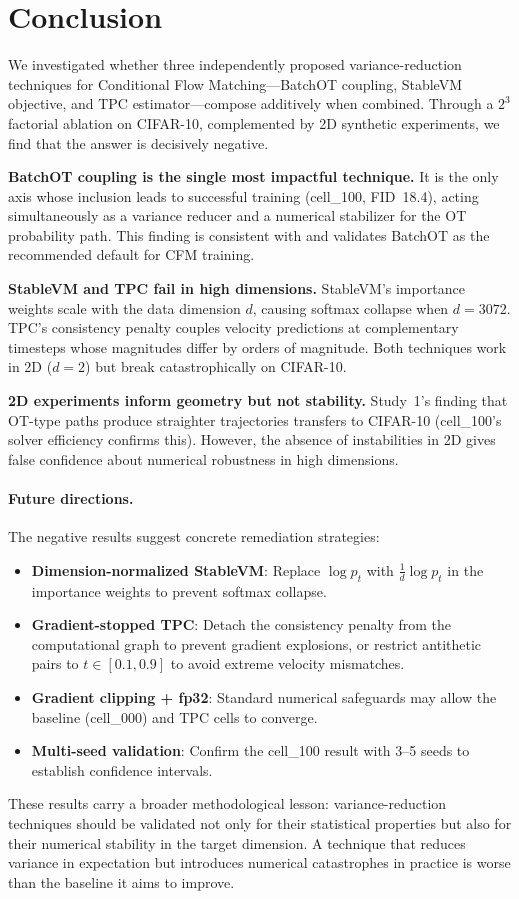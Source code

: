 \section{Conclusion}
\label{sec:conclusion}

We investigated whether three independently proposed variance-reduction techniques for Conditional Flow Matching---BatchOT coupling, StableVM objective, and TPC estimator---compose additively when combined. Through a $2^3$ factorial ablation on CIFAR-10, complemented by 2D synthetic experiments, we find that the answer is decisively negative.

\textbf{BatchOT coupling is the single most impactful technique.} It is the only axis whose inclusion leads to successful training (cell\_100, FID~18.4), acting simultaneously as a variance reducer and a numerical stabilizer for the OT probability path. This finding is consistent with \citet{tong2024improving} and validates BatchOT as the recommended default for CFM training.

\textbf{StableVM and TPC fail in high dimensions.} StableVM's importance weights scale with the data dimension $d$, causing softmax collapse when $d = 3072$. TPC's consistency penalty couples velocity predictions at complementary timesteps whose magnitudes differ by orders of magnitude. Both techniques work in 2D ($d=2$) but break catastrophically on CIFAR-10.

\textbf{2D experiments inform geometry but not stability.} Study~1's finding that OT-type paths produce straighter trajectories transfers to CIFAR-10 (cell\_100's solver efficiency confirms this). However, the absence of instabilities in 2D gives false confidence about numerical robustness in high dimensions.

\paragraph{Future directions.} The negative results suggest concrete remediation strategies:
\begin{itemize}[leftmargin=*]
    \item \textbf{Dimension-normalized StableVM}: Replace $\log p_t$ with $\frac{1}{d}\log p_t$ in the importance weights to prevent softmax collapse.
    \item \textbf{Gradient-stopped TPC}: Detach the consistency penalty from the computational graph to prevent gradient explosions, or restrict antithetic pairs to $t \in [0.1, 0.9]$ to avoid extreme velocity mismatches.
    \item \textbf{Gradient clipping + fp32}: Standard numerical safeguards may allow the baseline (cell\_000) and TPC cells to converge.
    \item \textbf{Multi-seed validation}: Confirm the cell\_100 result with 3--5 seeds to establish confidence intervals.
\end{itemize}

These results carry a broader methodological lesson: variance-reduction techniques should be validated not only for their statistical properties but also for their numerical stability in the target dimension. A technique that reduces variance in expectation but introduces numerical catastrophes in practice is worse than the baseline it aims to improve.
